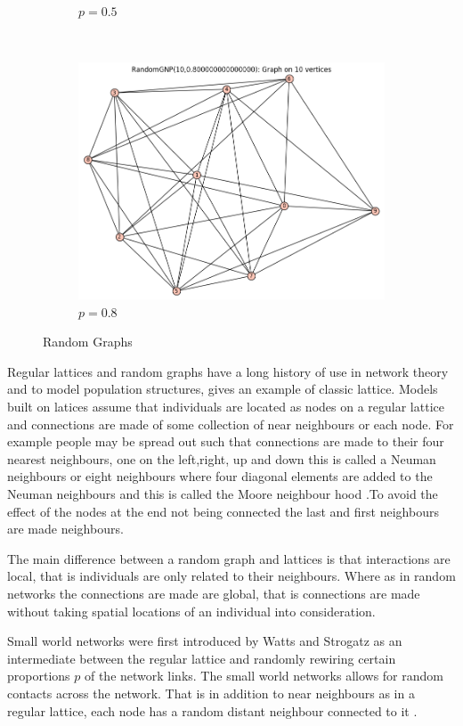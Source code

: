 \begin{figure}[h]
\begin{subfigure}[b]{0.3\textwidth}
        \caption{$p=0.5$}
        \label{fig:b}
    \end{subfigure}
    ~ %
    \begin{subfigure}[b]{0.3\textwidth}
        \includegraphics[width=\textwidth]{images/rgraph3}
        \caption{$p= 0.8$}
        \label{fig:c}
    \end{subfigure}
    \caption{Random Graphs}\label{fig:randomgraphs}
\end{figure}




Regular lattices and random graphs have a long history of use in network theory and to model population structures,\cite{harris1974contact}  gives an example of classic lattice. Models built on latices assume that individuals are located as nodes on a regular lattice and connections are made of some collection of near neighbours or each node. For example people may be spread out such that connections are made to their four nearest neighbours, one on the left,right, up and down this is called a Neuman neighbours  or eight neighbours where four diagonal elements are added to the Neuman neighbours and this is called the Moore neighbour hood \citep{lloyd2006infection}.To avoid the effect of the nodes at the end not being connected the last and first neighbours are made neighbours.

The main difference between a random graph and lattices is that interactions are local, that is individuals are only related to their neighbours. Where as in random networks the connections are made are global, that is connections are made without taking spatial locations of an individual into consideration. 


Small world networks  were first introduced by Watts and Strogatz as an intermediate between the regular lattice and randomly rewiring certain proportions $p$ of the network links\citep{watts1998collective}. The small world networks allows for random contacts across the network. That is in addition to near neighbours as in a regular lattice, each node has a random distant neighbour connected to it \citep{watts1998collective}.

 
  